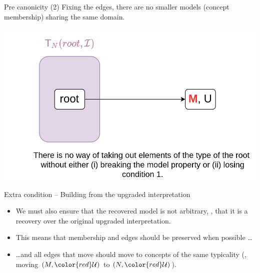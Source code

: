 \documentclass[10pt]{beamer}
\begin{document}
\begin{frame}[fragile]{Pre canonicity}
  \large (2) Fixing the edges, there are no smaller models (\wrt concept membership) sharing the same domain.
  \begin{center}
  \includegraphics[scale=.3]{img/invariant_2.png}
  \end{center}
\end{frame}

\begin{frame}[fragile]{Extra condition -- Building from the upgraded interpretation}

  \begin{itemize}
  \item We must also ensure that the recovered model is not arbitrary, \ie, that it is a recovery over the original upgraded interpretation.
  \item This means that membership and edges should be preserved when possible \dots 
  \item \dots and all edges that move should move to concepts of the same typicality (\eg, moving $(M, {\color{red}\Umc})$ to $(N, {\color{red}\Umc})$).
\end{itemize}

\end{frame}
\end{document}
